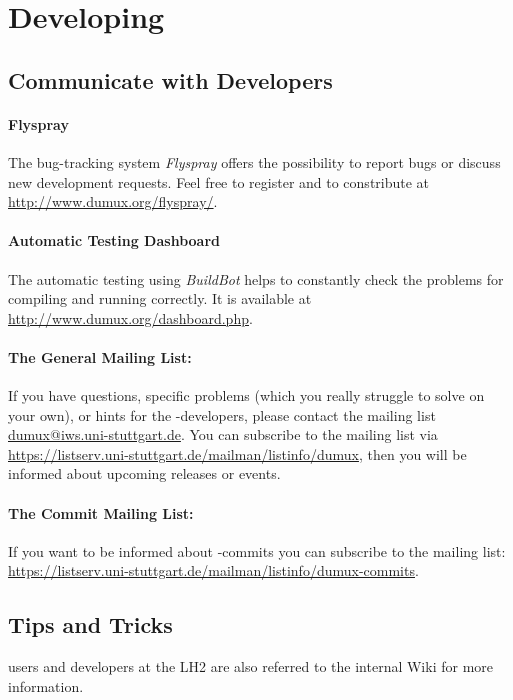 \section{Developing \Dumux}
\label{sc_developingdumux}

\subsection{Communicate with \Dumux Developers}
\paragraph{Flyspray}
The bug-tracking system \emph{Flyspray} offers the possibility to report bugs or
discuss new development requests. Feel free to register and to constribute
at \url{http://www.dumux.org/flyspray/}.

\paragraph{Automatic Testing Dashboard}
The automatic testing using \emph{BuildBot} helps to constantly check the
\Dumux problems for compiling and running correctly. It is available at
\url{http://www.dumux.org/dashboard.php}.

\paragraph{The General Mailing List:}
If you have questions, specific problems (which you really struggle to solve on your own),
or hints for the \Dumux-developers, please contact the mailing list \url{dumux@iws.uni-stuttgart.de}.
You can subscribe to the mailing list via
\url{https://listserv.uni-stuttgart.de/mailman/listinfo/dumux}, then you
will be informed about upcoming releases or events.

\paragraph{The Commit Mailing List:}
If you want to be informed about \Dumux-commits you can subscribe to the mailing list:
\url{https://listserv.uni-stuttgart.de/mailman/listinfo/dumux-commits}.


\subsection{Tips and Tricks}
\Dumux users and developers at the LH2 are also referred to the internal Wiki for
more information.

